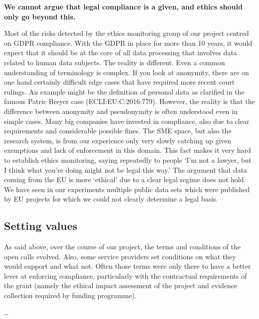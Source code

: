 \documentclass[	DIV=calc,%
							paper=a4,%
							fontsize=11pt,%
							twocolumn, draft]{scrartcl}	 					%
\begin{document}
\textbf{We cannot argue that legal compliance is a given, and ethics
should only go beyond this.}

Most of the risks detected by the ethics monitoring group of our project
centred on GDPR compliance. With the GDPR in place for more than 10
years, it would expect that it should be at the core of all data
processing that involves data related to human data subjects. The
reality is different. Even a common understanding of terminology is
complex. If you look at anonymity, there are on one hand certainly
difficult edge cases that have required more recent court rulings. An
example might be the definition of personal data as clarified in the
famous Patric Breyer case (ECLI:EU:C:2016:779). However, the reality is
that the difference between anonymity and pseudonymity is often
understood even in simple cases. Many big companies have invested in
compliance, also due to clear requirements and considerable possible
fines. The SME space, but also the research system, is from our
experience only very slowly catching up given exemptions and lack of
enforcement in this domain. This fact makes it very hard to establish
ethics monitoring, saying repeatedly to people `I'm not a lawyer, but I
think what you're doing might not be legal this way.' The argument that
data coming from the EU is more `ethical' due to a clear legal regime
does not hold. We have seen in our experiments multiple public data sets
which were published by EU projects for which we could not clearly
determine a legal basis.

\subsection{Setting values}\label{setting-values}

As said above, over the course of our project, the terms and conditions
of the open calls evolved. Also, some service providers set conditions
on what they would support and what not. Often those terms were only
there to have a better lever at enforcing compliance, particularly with
the contractual requirements of the grant (namely the ethical impact
assessment of the project and evidence collection required by funding
programme).

\ldots{}
\end{document}
